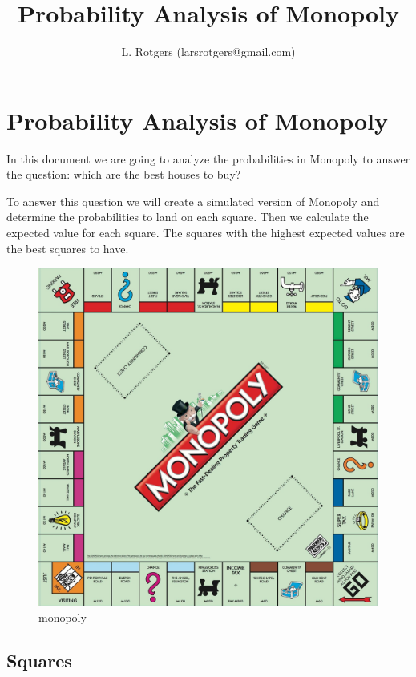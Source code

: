 \documentclass[11pt]{article}
\title{Probability Analysis of Monopoly}
\author{L. Rotgers (larsrotgers@gmail.com)}
\makeatletter
\def\maxwidth{\ifdim\Gin@nat@width>\linewidth\linewidth
    \else\Gin@nat@width\fi}
\let\Oldincludegraphics\includegraphics
\renewcommand{\includegraphics}[1]{\Oldincludegraphics[width=.8\maxwidth]{#1}}
\makeatother
\begin{document}
    
    
    \maketitle
    \newpage
    \tableofcontents
    \newpage
  

    \hypertarget{probability-analysis-of-monopoly}{%
\section{Probability Analysis of
Monopoly}\label{probability-analysis-of-monopoly}}

    In this document we are going to analyze the probabilities in Monopoly
to answer the question: which are the best houses to buy?

To answer this question we will create a simulated version of Monopoly
and determine the probabilities to land on each square. Then we
calculate the expected value for each square. The squares with the
highest expected values are the best squares to have.

    \begin{figure}[H]
\centering
\includegraphics{monopoly_1.jpg}
\caption{monopoly}
\end{figure}

    \hypertarget{squares}{%
\subsection{Squares}\label{squares}}
\end{document}
